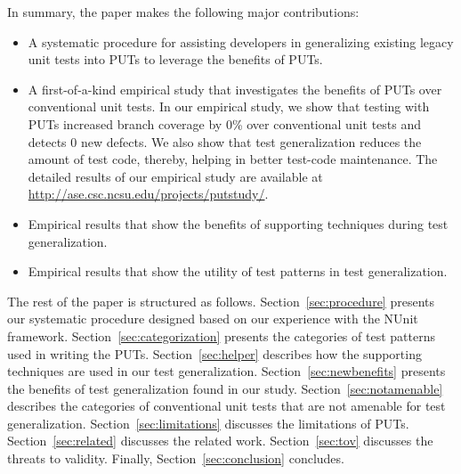 In summary, the paper makes the following major contributions:

\begin{itemize}
	\item A systematic procedure for assisting developers in generalizing existing legacy unit tests into PUTs to leverage the benefits of PUTs.
	\item A first-of-a-kind empirical study that investigates the benefits of PUTs over conventional unit tests. In our empirical study, we show that testing with PUTs increased branch coverage by $0$\% over conventional unit tests and detects $0$ new defects. We also show that test generalization reduces the amount of test code, thereby, helping in better test-code maintenance. The detailed results of our empirical study are available at \url{http://ase.csc.ncsu.edu/projects/putstudy/}.	
	\item Empirical results that show the benefits of supporting techniques during test generalization. 
	\item Empirical results that show the utility of test patterns in test generalization.
\end{itemize}

The rest of the paper is structured as follows. 
Section~\ref{sec:procedure} presents our systematic procedure designed based on our experience with the NUnit framework.
Section~\ref{sec:categorization} presents the categories of test patterns used in writing the PUTs. 
Section~\ref{sec:helper} describes how the supporting techniques are used in our test generalization. 
Section~\ref{sec:newbenefits} presents the benefits of test generalization found in our study. 
Section~\ref{sec:notamenable} describes the categories of conventional unit tests that are not amenable for test generalization.
Section~\ref{sec:limitations} discusses the limitations of PUTs. Section~\ref{sec:related} discusses the related work. Section~\ref{sec:tov} discusses the threats to validity. Finally, Section~\ref{sec:conclusion} concludes.